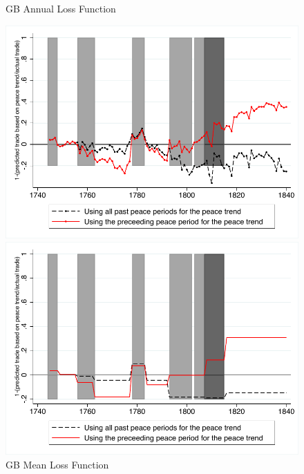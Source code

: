 \documentclass[12pt,a4paper,notitlepage,english]{article}
\begin{document}
\begin{center}
\begin{figure}[H]
\caption{GB Annual Loss Function}
\label{GBannual_loss_function}
\centering
\includegraphics[scale=0.9]{GBAnnual_loss_function.pdf}
\caption{GB Mean Loss Function}
\label{GBmean_loss_function}
\includegraphics[scale=0.9]{GBMean_loss_function.pdf}
\end{figure}
\end{center}
\end{document}
